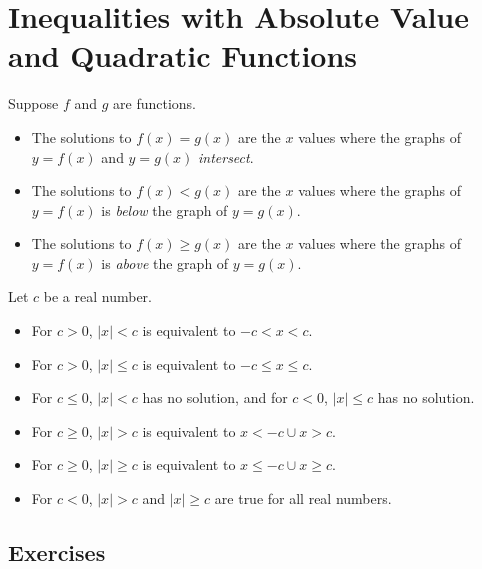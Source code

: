 \section{Inequalities with Absolute Value and Quadratic Functions}

\begin{definition}
    Suppose $f$ and $g$ are functions.
    \begin{itemize}
        \item The solutions to $f(x)=g(x)$ are the $x$ values where the graphs of $y=f(x)$ and $y=g(x)$ \textit{intersect}.
        \item The solutions to $f(x)<g(x)$ are the $x$ values where the graphs of $y=f(x)$ is \textit{below} the graph of $y=g(x)$.
        \item The solutions to $f(x)\geq g(x)$ are the $x$ values where the graphs of $y=f(x)$ is \textit{above} the graph of $y=g(x)$.
    \end{itemize}
\end{definition}

\begin{definition}
    Let $c$ be a real number.
    \begin{itemize}
        \item For $c>0$, $|x|<c$ is equivalent to $-c < x < c$.
        \item For $c>0$, $|x|\leq c$ is equivalent to $-c \leq x \leq c$.
        \item For $c \leq 0$, $|x|<c$ has no solution, and for $c < 0$, $|x| \leq c$ has no solution.
        \item For $c\geq 0$, $|x| > c$ is equivalent to $x<-c \cup x>c$.
        \item For $c\geq 0$, $|x| \geq c$ is equivalent to $x\leq -c \cup x \geq c$.
        \item For $c < 0$, $|x| > c$ and $|x| \geq c$ are true for all real numbers.
    \end{itemize}
\end{definition}

\subsection{Exercises}
